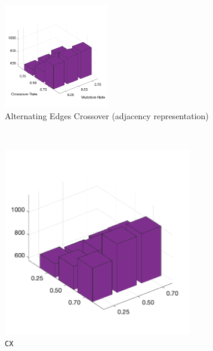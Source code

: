 \begin{figure}[H]
	\centering
%
	\begin{subfigure}[b]{0.7\textwidth}
		\centering
		\includegraphics[width=0.5\textwidth]{crossover/min/cross_alt_edges_4.png}
		\caption{Alternating Edges Crossover (adjacency representation)}
		\label{fig:z}
    	\end{subfigure}\\
%
	\begin{subfigure}[b]{0.25\textwidth}
		\centering
		\includegraphics[width=0.9\textwidth]{crossover/min/cross_cycle_4.png}
		\caption{\texttt{CX}}
		\label{fig:x}
    	\end{subfigure}
%
	\begin{subfigure}[b]{0.25\textwidth}
		\centering

\end{subfigure}
\end{figure}
